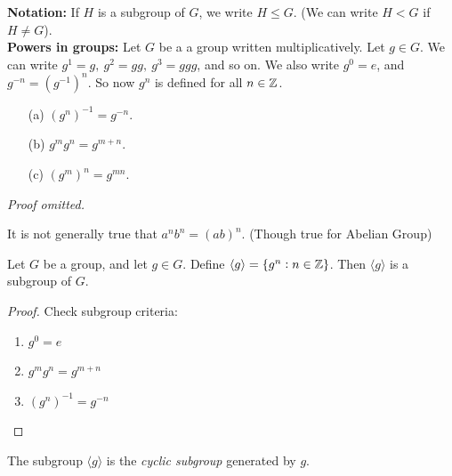 \documentclass[10pt]{scrartcl}
\begin{document}
\noindent \textbf{Notation:} If $H$ is a subgroup of $G$, we write $H \leq G$. (We can write $H < G$ if $H \neq G$).\\

\noindent \textbf{Powers in groups:} Let $G$ be a a group written multiplicatively. Let $g \in G$. We can write $g^1 = g, ~ g^2 = gg,~ g^3 = ggg$, and so on. We also write $g^{0} = e$, and $g^{-n} = (g^{-1})^n$. So now $g^n$ is defined for all $n \in \mathbb{Z}$.\\

\begin{proposition}\begin{itemize}
 \item[(a)] $(g^n)^{-1} = g^{-n}$.
 \item[(b)] $g^mg^n = g^{m+n}$.
 \item[(c)] $(g^m)^n = g^{mn}$.	
 \end{itemize}
 \end{proposition}
 
 \emph{Proof omitted.}
 
\begin{warning} It is not generally true that $a^nb^n = (ab)^n$. (Though true for Abelian Group)	
\end{warning}

\begin{proposition} Let $G$ be a group, and let $g \in G$. Define $\langle g\rangle  = \{g^n : n \in \mathbb{Z}\}$. Then $\langle g\rangle $  is a subgroup of $G$.	
\end{proposition}

 \begin{proof}
 	Check subgroup criteria: \begin{enumerate}
 \item $g^{0} = e$
 \item $g^mg^n = g^{m+n}$
 \item $(g^n)^{-1} = g^{-n}$ \qedhere 
 \end{enumerate}\end{proof}\vspace*{10pt}
 

\begin{definition} The subgroup $\langle g \rangle$ is the \emph{cyclic subgroup} generated by $g$.
	
\end{definition}\vspace*{10pt}
\end{document}
